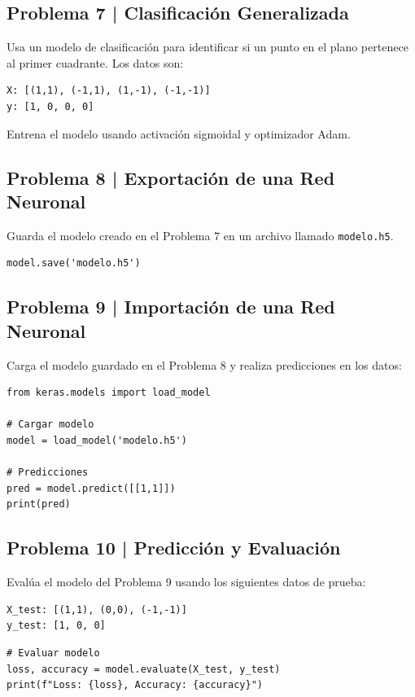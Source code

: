 \documentclass{article}
\begin{document}
\clearpage

\subsection*{Problema 7 | Clasificación Generalizada}

Usa un modelo de clasificación para identificar si un punto en el plano pertenece al primer cuadrante. Los datos son:

\begin{verbatim}
X: [(1,1), (-1,1), (1,-1), (-1,-1)]
y: [1, 0, 0, 0]
\end{verbatim}

Entrena el modelo usando activación sigmoidal y optimizador Adam.

\clearpage

\subsection*{Problema 8 | Exportación de una Red Neuronal}

Guarda el modelo creado en el Problema 7 en un archivo llamado \texttt{modelo.h5}.

\begin{lstlisting}[style=python]
model.save('modelo.h5')
\end{lstlisting}

\clearpage

\subsection*{Problema 9 | Importación de una Red Neuronal}

Carga el modelo guardado en el Problema 8 y realiza predicciones en los datos:

\begin{lstlisting}[style=python]
from keras.models import load_model

# Cargar modelo
model = load_model('modelo.h5')

# Predicciones
pred = model.predict([[1,1]])
print(pred)
\end{lstlisting}

\clearpage

\subsection*{Problema 10 | Predicción y Evaluación}

Evalúa el modelo del Problema 9 usando los siguientes datos de prueba:

\begin{verbatim}
X_test: [(1,1), (0,0), (-1,-1)]
y_test: [1, 0, 0]
\end{verbatim}

\begin{lstlisting}[style=python]
# Evaluar modelo
loss, accuracy = model.evaluate(X_test, y_test)
print(f"Loss: {loss}, Accuracy: {accuracy}")
\end{lstlisting}
\end{document}
